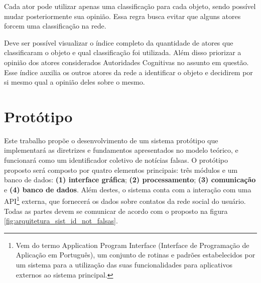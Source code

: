 Cada ator pode utilizar apenas uma classificação para cada objeto, sendo possível mudar posteriormente sua opinião. Essa regra busca evitar que alguns atores forcem uma classificação na rede.

Deve ser possível visualizar o índice completo da quantidade de atores que classificaram o objeto e qual classificação foi utilizada. Além disso priorizar a opinião dos atores considerados Autoridades Cognitivas no assunto em questão. Esse índice auxilia os outros atores da rede a identificar o objeto e decidirem por si mesmo qual a opinião deles sobre o mesmo.



\section{Protótipo}

Este trabalho propõe o desenvolvimento de um sistema protótipo que implementará as diretrizes e fundamentos apresentados no modelo teórico, e funcionará como um identificador coletivo de notícias falsas. O protótipo proposto será composto por quatro elementos principais: três módulos e um banco de dados: \textbf{(1) interface gráfica}; \textbf{(2) processamento}; \textbf{(3) comunicação} e \textbf{(4) banco de dados}. Além destes, o sistema conta com a interação com uma API\footnote{Vem do termo Application Program Interface (Interface de Programação de Aplicação em Português), um conjunto de rotinas e padrões estabelecidos por um sistema para a utilização das suas funcionalidades para aplicativos externos ao sistema principal.} externa, que fornecerá os dados sobre contatos da rede social do usuário. Todas as partes devem se comunicar de acordo com o proposto na figura \ref{fig:arquitetura_sist_id_not_falsas}.

